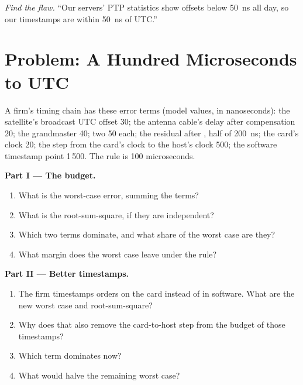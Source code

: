\begin{exercise}[$\star\star\star$]\label{exo:nw:time-synchronisation:8}
\emph{Find the flaw.} ``Our servers' PTP statistics show offsets below 50~ns all day, so our timestamps are within 50~ns of UTC.''
\end{exercise}

\section{Problem: A Hundred Microseconds to UTC}

\begin{problem}\label{pb:nw:time-synchronisation:1}
A firm's timing chain has these error terms (model values, in nanoseconds): the satellite's broadcast UTC offset 30; the antenna cable's
delay after compensation 20; the grandmaster 40; two  50 each; the residual  after ,
half of \qty{200}{\nano\second}; the card's clock 20; the step from the card's clock to the host's clock 500; the software timestamp
point 1\,500. The rule is 100 microseconds.

\medskip\noindent\textbf{Part I --- The budget.}
\begin{enumerate}
\item What is the worst-case error, summing the terms?
\item What is the root-sum-square, if they are independent?
\item Which two terms dominate, and what share of the worst case are they?
\item What margin does the worst case leave under the rule?
\end{enumerate}

\medskip\noindent\textbf{Part II --- Better timestamps.}
\begin{enumerate}[resume]
\item The firm timestamps orders on the card instead of in software. What are the new worst case and root-sum-square?
\item Why does that also remove the card-to-host step from the budget of those timestamps?
\item Which term dominates now?
\item What would halve the remaining worst case?
\end{enumerate}


\end{problem}
